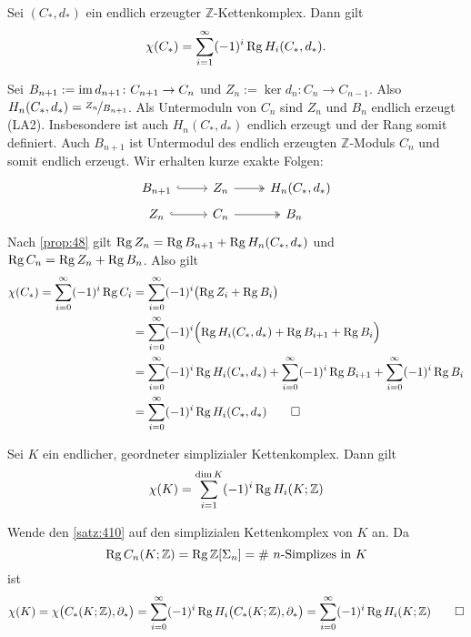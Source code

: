 \begin{satz}[{name=[Eulercharakteristik eines endlich erzeugten Z-Kettenkomplexes]},label=satz:410]
	Sei $(C_*,d_*)$ ein endlich erzeugter $\mathbb{Z}$-Kettenkomplex. Dann gilt 
	\[
		\chi(C_*) = \sum_{i=1}^{\infty} (-1)^i \Rg H_i(C_*,d_*).
	\]
\end{satz}
\begin{beweis}
	Sei $B_{n+1} := \im d_{n+1} \colon C_{n+1} \to C_n$ und $Z_n := \ker d_n \colon C_n \to C_{n-1}$. Also $H_n(C_*,d_*) = \nicefrac{Z_n}{B_{n+1}}$.
	Als Untermoduln von $C_n$ sind $Z_n$ und $B_n$ endlich erzeugt (LA2). Insbesondere ist auch $H_n(C_*,d_*)$ endlich erzeugt und der Rang somit definiert. Auch $B_{n+1}$
	ist Untermodul des endlich erzeugten $\mathbb{Z}$-Moduls $C_n$ und somit endlich erzeugt.
	Wir erhalten kurze exakte Folgen:
	\[
		\begin{tikzcd}[row sep=0.4em]
			B_{n+1} \rar[hook] & Z_n \rar[two heads] & H_n(C_*, d_*) \\
			Z_n \rar[hook] & C_n \rar[two heads] & B_n \quad 
		\end{tikzcd}
	\]
	Nach \autoref{prop:48} gilt $\Rg Z_n = \Rg B_{n+1} + \Rg H_n(C_*,d_*)$ und $\Rg C_n = \Rg Z_n + \Rg B_n$. Also gilt
	\begin{align*}
		\chi(C_*) = \sum_{i=0}^{\infty} (-1)^i \Rg C_i &= \sum_{i=0}^{\infty} (-1)^i \enbrace[\big]{\Rg Z_i + \Rg B_i} \\  
		&= \sum_{i=0}^{\infty} (-1)^i \enbrace[\Big]{\Rg H_i(C_*,d_*) + \Rg B_{i+1} + \Rg B_i} \\
		&= \sum_{i=0}^{\infty} (-1)^i \Rg H_i(C_*,d_*) + \sum_{i=0}^{\infty} (-1)^i \Rg B_{i+1} + \sum_{i=0}^{\infty}(-1)^i \Rg B_i \\
		&= \sum_{i=0}^{\infty} (-1)^i \Rg H_i(C_*,d_*)  \qedhere  
	\end{align*}
\end{beweis}

\begin{korollar}[{name=[Die Eulercharakteristik eines simplizialen Komplexes]}]
	Sei $K$ ein endlicher, geordneter simplizialer Kettenkomplex. 
	Dann gilt
	\[
		\chi(K) = \sum_{i=1}^{\dim K} (-1)^i \Rg H_i(K;\mathbb{Z})
	\]
\end{korollar}
\begin{beweis}
	Wende den \autoref{satz:410} auf den simplizialen Kettenkomplex von $K$ an. Da 
	\[
		\Rg C_n(K;\mathbb{Z}) = \Rg \mathbb{Z}[\Sigma_n] = \# \text{ $n$-Simplizes in $K$}
	\]
	ist
	\[
		\chi(K) = \chi \enbrace[\big]{C_*(K;\mathbb{Z}), \partial_*} = \sum_{i=0}^{\infty} (-1)^i \Rg H_i \enbrace[\big]{C_*(K;\mathbb{Z}), \partial_*}  =
		\sum_{i=0}^{\infty} (-1)^i \Rg H_i \enbrace*{K;\mathbb{Z}} \qedhere
	\]
\end{beweis}

